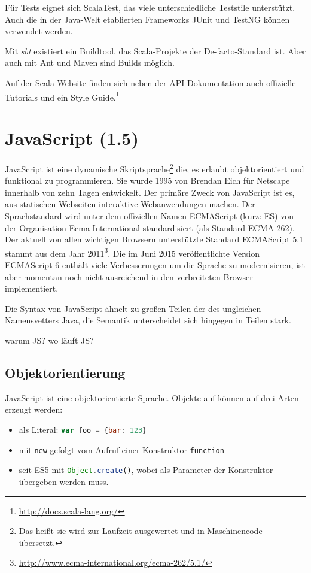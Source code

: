 \documentclass[a4paper, 12pt, listof=totoc, bibliography=totoc]{scrreprt}
\begin{document}
Für Tests eignet sich ScalaTest, das viele unterschiedliche Teststile unterstützt. Auch die in der Java-Welt etablierten Frameworks JUnit und TestNG können verwendet werden.

Mit \textit{sbt} existiert ein Buildtool, das Scala-Projekte der De-facto-Standard ist. Aber auch mit Ant und Maven sind Builds möglich.

Auf der Scala-Website finden sich neben der API-Dokumentation auch offizielle Tutorials und ein Style Guide.\footnote{\url{http://docs.scala-lang.org/}}



\section{JavaScript (1.5)}

JavaScript ist eine dynamische Skriptsprache\footnote{Das heißt sie wird zur Laufzeit ausgewertet und in Maschinencode übersetzt.} die, es erlaubt objektorientiert und funktional zu programmieren. Sie wurde 1995 von Brendan Eich für Netscape innerhalb von zehn Tagen entwickelt\cite{wikipedia.JS}. Der primäre Zweck von JavaScript ist es, aus statischen Webseiten interaktive Webanwendungen machen\cite[S. 361]{flanagan2011.JDG}. Der Sprachstandard wird unter dem offiziellen Namen ECMAScript (kurz: ES) von der Organisation Ecma International standardisiert (als Standard ECMA-262). Der aktuell von allen wichtigen Browsern unterstützte Standard ECMAScript 5.1 stammt aus dem Jahr 2011\footnote{\url{http://www.ecma-international.org/ecma-262/5.1/}}. Die im Juni 2015 veröffentlichte Version ECMAScript 6 enthält viele Verbesserungen um die Sprache zu modernisieren, ist aber momentan noch nicht ausreichend in den verbreiteten Browser implementiert.

Die Syntax von JavaScript ähnelt zu großen Teilen der des ungleichen Namensvetters Java, die Semantik unterscheidet sich hingegen in Teilen stark\cite{eich1996.JSL}.

warum JS?
wo läuft JS?


\subsection{Objektorientierung}

JavaScript ist eine objektorientierte Sprache. Objekte auf können auf drei Arten erzeugt werden:

\begin{itemize}
	\item als Literal: \lstinline[language=JavaScript, style=inline]|var foo = {bar: 123}|
	\item mit \texttt{new} gefolgt vom Aufruf einer Konstruktor-\texttt{function}
	\item seit ES5 mit \lstinline[language=JavaScript, style=inline]|Object.create()|, wobei als Parameter der Konstruktor übergeben werden muss.
\end{itemize}
\end{document}
